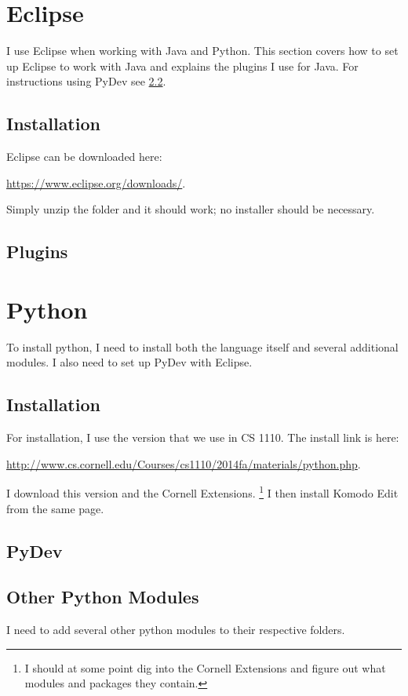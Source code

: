 \documentclass{article}
\newcommand{\web}[2]{
	\begin{center}
		\url{#1}{#2}
	\end{center}
}
\begin{document}
\section{Eclipse}

I use Eclipse when working with Java and Python.
This section covers how to set up Eclipse to work with Java and explains the plugins I use for Java.
For instructions using PyDev see \cref{subsec:PyDev}.

\subsection{Installation}
Eclipse can be downloaded here:
	\web{https://www.eclipse.org/downloads/}.
Simply unzip the folder and it should work; no installer should be necessary.

\subsection{Plugins}

\section{Python}

To install python, I need to install both the language itself and several additional modules.
I also need to set up PyDev with Eclipse.

\subsection{Installation}

For installation, I use the version that we use in CS 1110.
The install link is here:
	\web{http://www.cs.cornell.edu/Courses/cs1110/2014fa/materials/python.php}.
I download this version and the Cornell Extensions.
\footnote{
	I should at some point dig into the Cornell Extensions and figure out what modules and packages
		they contain.
}
I then install Komodo Edit from the same page.

\subsection{PyDev}
\label{subsec:PyDev}

\subsection{Other Python Modules}

I need to add several other python modules to their respective folders.
\end{document}

